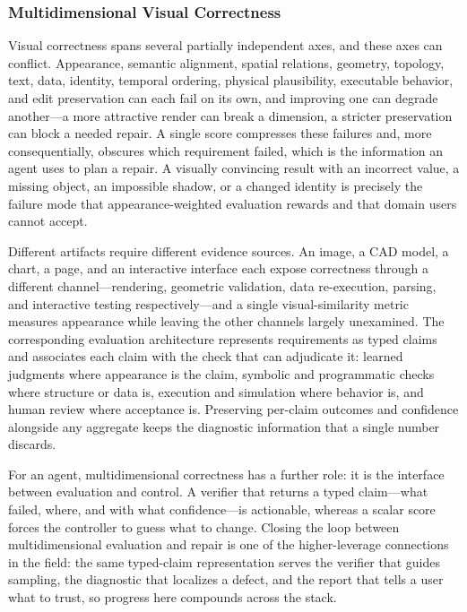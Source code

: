 \subsubsection{Multidimensional Visual Correctness}

Visual correctness spans several partially independent axes, and these axes can conflict. Appearance, semantic alignment, spatial relations, geometry, topology, text, data, identity, temporal ordering, physical plausibility, executable behavior, and edit preservation can each fail on its own, and improving one can degrade another---a more attractive render can break a dimension, a stricter preservation can block a needed repair. A single score compresses these failures and, more consequentially, obscures which requirement failed, which is the information an agent uses to plan a repair. A visually convincing result with an incorrect value, a missing object, an impossible shadow, or a changed identity is precisely the failure mode that appearance-weighted evaluation rewards and that domain users cannot accept.

Different artifacts require different evidence sources. An image, a CAD model, a chart, a page, and an interactive interface each expose correctness through a different channel---rendering, geometric validation, data re-execution, parsing, and interactive testing respectively---and a single visual-similarity metric measures appearance while leaving the other channels largely unexamined. The corresponding evaluation architecture represents requirements as typed claims and associates each claim with the check that can adjudicate it: learned judgments where appearance is the claim, symbolic and programmatic checks where structure or data is, execution and simulation where behavior is, and human review where acceptance is. Preserving per-claim outcomes and confidence alongside any aggregate keeps the diagnostic information that a single number discards.

For an agent, multidimensional correctness has a further role: it is the interface between evaluation and control. A verifier that returns a typed claim---what failed, where, and with what confidence---is actionable, whereas a scalar score forces the controller to guess what to change. Closing the loop between multidimensional evaluation and repair is one of the higher-leverage connections in the field: the same typed-claim representation serves the verifier that guides sampling, the diagnostic that localizes a defect, and the report that tells a user what to trust, so progress here compounds across the stack.

